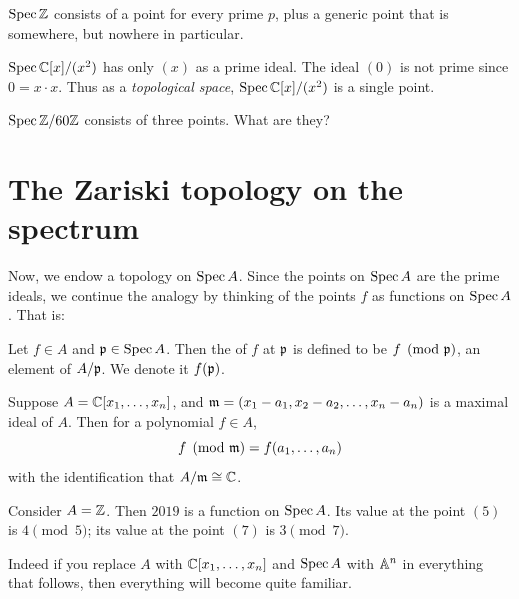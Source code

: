 \begin{example}
	\listhack
	\begin{enumerate}[(a)]
		\ii $\operatorname{Spec} \mathbb Z$ consists of a point for every prime $p$,
		plus a generic point that is somewhere, but nowhere in particular.

		\ii $\operatorname{Spec} \mathbb C[x] / (x^2)$ has only $(x)$ as a prime ideal.
		The ideal $(0)$ is not prime since $0 = x \cdot x$.
		Thus as a \emph{topological space},
		$\operatorname{Spec} \mathbb C[x] / (x^2)$ is a single point.

		\ii $\operatorname{Spec} \mathbb Z/60\mathbb Z$ consists of three points.
		What are they?
	\end{enumerate}
\end{example}

\section{The Zariski topology on the spectrum}

Now, we endow a topology on $\operatorname{Spec} A$.
Since the points on $\operatorname{Spec} A$ are the prime ideals, we continue
the analogy by thinking of the points $f$ as functions on $\operatorname{Spec} A$. That is:
\begin{definition}
	Let $f \in A$ and $\mathfrak p \in \operatorname{Spec} A$.
	Then the  of $f$ at $\mathfrak p$ is defined to be $f \pmod{\mathfrak p}$,
	an element of $A/\mathfrak p$.
	We denote it $f(\mathfrak p)$.
\end{definition}
\begin{example}
	Suppose $A = \mathbb C[x_1, \dots, x_n]$,
	and $\mathfrak m = (x_1-a_1, x_2-a_2, \dots, x_n-a_n)$ is a maximal ideal of $A$.
	Then for a polynomial $f \in A$,
	\[ f \pmod {\mathfrak m} = f(a_1, \dots, a_n) \]
	with the identification that $A/\mathfrak m \cong \mathbb C$.
\end{example}
\begin{example}
	Consider $A = \mathbb Z$.
	Then $2019$ is a function on $\operatorname{Spec} A$.
	Its value at the point $(5)$ is $4 \pmod 5$;
	its value at the point $(7)$ is $3 \pmod 7$.
\end{example}

Indeed if you replace $A$ with $\mathbb C[x_1, \dots, x_n]$
and $\operatorname{Spec} A$ with $\mathbb A^n$ in everything that follows,
then everything will become quite familiar.


